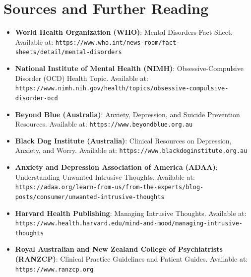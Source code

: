 \section*{Sources and Further Reading}
\begin{itemize}
  \item \textbf{World Health Organization (WHO)}: Mental Disorders Fact Sheet. Available at: \texttt{https://www.who.int/news-room/fact-sheets/detail/mental-disorders}
  \item \textbf{National Institute of Mental Health (NIMH)}: Obsessive-Compulsive Disorder (OCD) Health Topic. Available at: \texttt{https://www.nimh.nih.gov/health/topics/obsessive-compulsive-disorder-ocd}
  \item \textbf{Beyond Blue (Australia)}: Anxiety, Depression, and Suicide Prevention Resources. Available at: \texttt{https://www.beyondblue.org.au}
  \item \textbf{Black Dog Institute (Australia)}: Clinical Resources on Depression, Anxiety, and Worry. Available at: \texttt{https://www.blackdoginstitute.org.au}
  \item \textbf{Anxiety and Depression Association of America (ADAA)}: Understanding Unwanted Intrusive Thoughts. Available at: \texttt{https://adaa.org/learn-from-us/from-the-experts/blog-posts/consumer/unwanted-intrusive-thoughts}
  \item \textbf{Harvard Health Publishing}: Managing Intrusive Thoughts. Available at: \texttt{https://www.health.harvard.edu/mind-and-mood/managing-intrusive-thoughts}
  \item \textbf{Royal Australian and New Zealand College of Psychiatrists (RANZCP)}: Clinical Practice Guidelines and Patient Guides. Available at: \texttt{https://www.ranzcp.org}
\end{itemize}